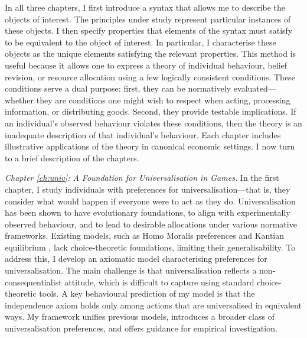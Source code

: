In all three chapters, I first introduce a syntax that allows me to describe the objects of interest. The principles under study represent particular instances of these objects. I then specify properties that elements of the syntax must satisfy to be equivalent to the object of interest. In particular, I characterise these objects as the unique elements satisfying the relevant properties. This method is useful because it allows one to express a theory of individual behaviour, belief revision, or resource allocation using a few logically consistent conditions. These conditions serve a dual purpose: first, they can be normatively evaluated—whether they are conditions one might wish to respect when acting, processing information, or distributing goods. Second, they provide testable implications. If an individual’s observed behaviour violates these conditions, then the theory is an inadequate description of that individual’s behaviour. Each chapter includes illustrative applications of the theory in canonical economic settings. I now turn to a brief description of the chapters.

\emph{Chapter \ref{ch:univ}: A Foundation for Universalisation in Games.} In the first chapter, I study individuals with preferences for universalisation—that is, they consider what would happen if everyone were to act as they do. Universalisation has been shown to have evolutionary foundations, to align with experimentally observed behaviour, and to lead to desirable allocations under various normative frameworks. Existing models, such as Homo Moralis preferences \citep{algerHomoMoralisPreference2013} and Kantian equilibrium \citep{roemer2019we}, lack choice-theoretic foundations, limiting their generalisability. To address this, I develop an axiomatic model characterising preferences for universalisation. The main challenge is that universalisation reflects a non-consequentialist attitude, which is difficult to capture using standard choice-theoretic tools. A key behavioural prediction of my model is that the independence axiom holds only among actions that are universalised in equivalent ways. My framework unifies previous models, introduces a broader class of universalisation preferences, and offers guidance for empirical investigation.


